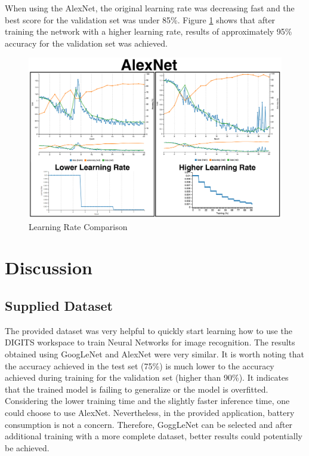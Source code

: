 \documentclass[10pt,journal,compsoc]{IEEEtran}
\begin{document}
When using the AlexNet, the original learning rate was decreasing fast and the best score for the validation set was under 85\%. Figure \ref{fig:learning_rate_comparisson} shows that after training the network with a higher learning rate, results of approximately 95\% accuracy for the validation set was achieved.

\begin{figure}[thpb]
      \centering
      \includegraphics[width=\linewidth]{o_aln_training_comparisson.png}
      \caption{Learning Rate Comparison}
      \label{fig:learning_rate_comparisson}
\end{figure}


\section{Discussion}

\subsection{Supplied Dataset}

The provided dataset was very helpful to quickly start learning how to use the DIGITS workspace to train Neural Networks for image recognition.
The results obtained using GoogLeNet and AlexNet were very similar. It is worth noting that the accuracy achieved in the test set (75\%) is much lower to the accuracy achieved during training for the validation set (higher than 90\%). It indicates that the trained model is failing to generalize or the model is overfitted.
Considering the lower training time and the slightly faster inference time, one could choose to use AlexNet. Nevertheless, in the provided application, battery consumption is not a concern. Therefore, GoggLeNet can be selected and after additional training with a more complete dataset, better results could potentially be achieved. 
\end{document}
